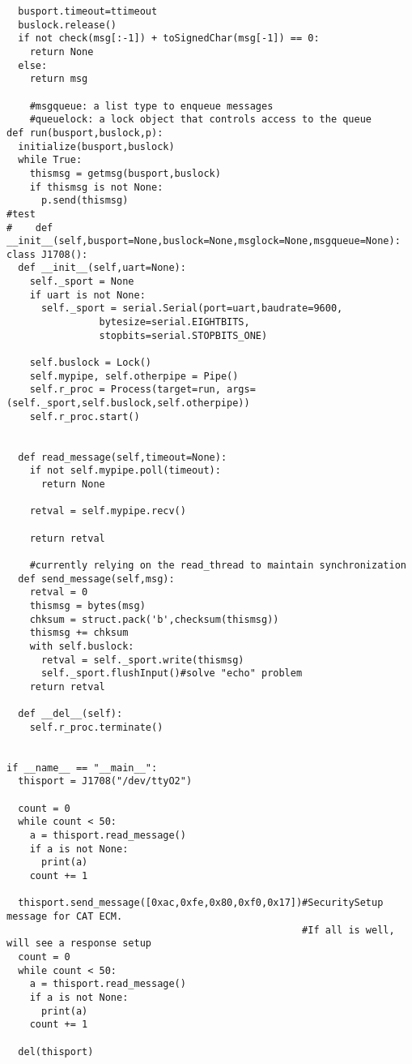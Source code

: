 \begin{appendices}
\begin{verbatim}
  busport.timeout=ttimeout
  buslock.release()
  if not check(msg[:-1]) + toSignedChar(msg[-1]) == 0:
    return None
  else:
    return msg

    #msgqueue: a list type to enqueue messages
    #queuelock: a lock object that controls access to the queue
def run(busport,buslock,p):
  initialize(busport,buslock)
  while True:
    thismsg = getmsg(busport,buslock)
    if thismsg is not None:
      p.send(thismsg)
#test
#    def __init__(self,busport=None,buslock=None,msglock=None,msgqueue=None):
class J1708():
  def __init__(self,uart=None):
    self._sport = None
    if uart is not None:
      self._sport = serial.Serial(port=uart,baudrate=9600,
                bytesize=serial.EIGHTBITS,
                stopbits=serial.STOPBITS_ONE)

    self.buslock = Lock()
    self.mypipe, self.otherpipe = Pipe()
    self.r_proc = Process(target=run, args=(self._sport,self.buslock,self.otherpipe))
    self.r_proc.start()


  def read_message(self,timeout=None):
    if not self.mypipe.poll(timeout):
      return None

    retval = self.mypipe.recv()

    return retval

    #currently relying on the read_thread to maintain synchronization
  def send_message(self,msg):
    retval = 0
    thismsg = bytes(msg)
    chksum = struct.pack('b',checksum(thismsg))
    thismsg += chksum
    with self.buslock:
      retval = self._sport.write(thismsg)
      self._sport.flushInput()#solve "echo" problem
    return retval
     
  def __del__(self):
    self.r_proc.terminate()


if __name__ == "__main__":
  thisport = J1708("/dev/ttyO2")
  
  count = 0
  while count < 50:
    a = thisport.read_message()
    if a is not None:
      print(a)
    count += 1

  thisport.send_message([0xac,0xfe,0x80,0xf0,0x17])#SecuritySetup message for CAT ECM.
                                                   #If all is well, will see a response setup
  count = 0
  while count < 50:
    a = thisport.read_message()
    if a is not None:
      print(a)
    count += 1

  del(thisport)
\end{verbatim}


\end{appendices}

